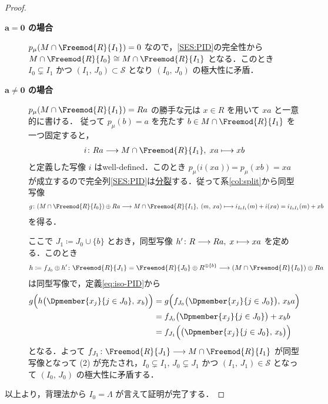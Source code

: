 \documentclass[algtopo_main]{subfiles}
\begin{document}
\begin{proof}
    \begin{description}
        \item[\textbf{$\bm{a=0}$ の場合}] $p_\mu (M \cap \Freemod{R}{I_1}) = 0$ なので，\eqref{SES:PID}の完全性から $M\cap \Freemod{R}{I_0} \cong M \cap \Freemod{R}{I_1}$ となる．このとき $I_0 \subsetneq I_1$ かつ $(I_1,\, J_0) \subset \mathcal{S}$ となり $(I_0,\, J_0)$ の極大性に矛盾．
        \item[\textbf{$\bm{a\neq 0}$ の場合}] $p_\mu(M \cap \Freemod{R}{I_1}) = Ra$ の勝手な元は $x \in R$ を用いて $xa$ と一意的に書ける．
        従って $p_\mu(b) = a$ を充たす $b \in M \cap \Freemod{R}{I_1}$ を一つ固定すると，
        \begin{align}
            i \colon Ra \lto M \cap \Freemod{R}{I_1},\; xa \lmto xb
        \end{align}
        と定義した写像 $i$ はwell-defined．このとき $p_\mu \bigl( i(xa) \bigr) = p_\mu (xb) = xa$ が成立するので完全列\eqref{SES:PID}は\hyperref[def:split]{分裂}する．従って系\ref{col:split}から同型写像
        \begin{align}
            g \colon (M \cap \Freemod{R}{I_0}) \oplus Ra \lto M \cap \Freemod{R}{I_1},\; (m,\, xa) \lmto i_{I_0I_1} (m) + i(xa) = i_{I_0I_1} (m) + xb
        \end{align}
        を得る．
        
        ここで $J_1 \coloneqq J_0 \cup \{b\}$ とおき，同型写像 $h' \colon R \longrightarrow Ra,\; x \longmapsto xa$ を定める．このとき
        \begin{align}
            h \coloneqq f_{J_0} \oplus h' \colon \Freemod{R}{J_1} = \Freemod{R}{J_0} \oplus R^{\oplus \{b\}} \lto (M \cap \Freemod{R}{I_0}) \oplus Ra
        \end{align}
        は同型写像で，定義\eqref{eq:iso-PID}から
        \begin{align}
            g \Bigl( h \bigl( \Dpmember{x_j}{j \in J_0},\, x_b \bigr)  \Bigr) &= g \Bigl( f_{J_0}\bigl( \Dpmember{x_j}{j \in J_0} \bigr),\, x_b a   \Bigr) \\
            &= f_{J_0} \bigl( \Dpmember{x_j}{j \in J_0} \bigr)  + x_b b \\
            &= f_{J_1} \Bigl( \bigl( \Dpmember{x_j}{j \in J_0},\, x_b \bigr)  \Bigr) 
        \end{align}
        となる．よって $f_{J_1} \colon \Freemod{R}{J_1} \lto M \cap \Freemod{R}{I_1}$ が同型写像となって (2) が充たされ，$I_0 \subsetneq I_1,\, J_0 \subsetneq J_1$ かつ $(I_1,\, J_1) \in \mathcal{S}$ となって $(I_0,\, J_0)$ の極大性に矛盾する．
    \end{description}
    
    以上より，背理法から $I_0 = \Lambda$ が言えて証明が完了する．
\end{proof}
\end{document}
